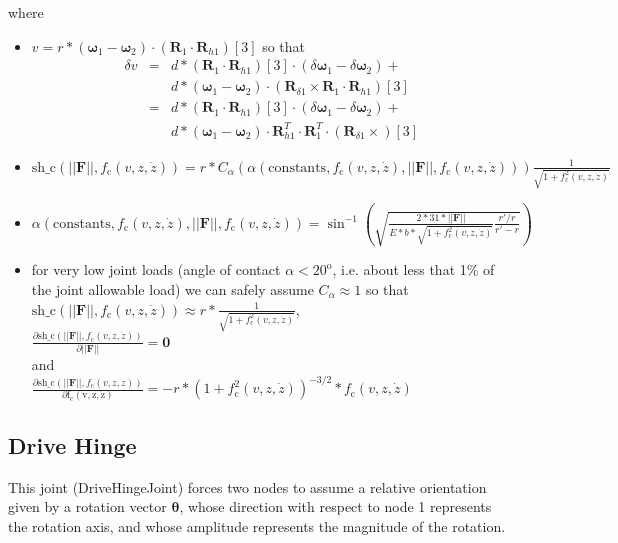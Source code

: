 \documentclass[10pt,dvips,fleqn,subeqn]{report}
\newcommand{\T}[1]{\boldsymbol{#1}}
\begin{document}
where
\begin{itemize}
\item
$v=r * (\T \omega_{1}-\T \omega_{2})\cdot(\T R_1\cdot \T R_{h1})[3]$
so that
\begin{eqnarray*}
\delta v &=& d * (\T R_1\cdot \T R_{h1})[3] \cdot (\delta \T \omega_{1}- \delta \T \omega_{2}) +\\
	&& d * (\T \omega_{1}-\T \omega_{2})\cdot (\T R_{\delta 1} \times \T R_1 \cdot \T R_{h1})[3]\\
	&=& d * (\T R_1\cdot \T R_{h1})[3] \cdot (\delta \T \omega_{1}- \delta \T \omega_{2}) +\\
	&& d * (\T \omega_{1}-\T \omega_{2})\cdot \T R_{h1}^T \cdot \T R_1^T \cdot (\T R_{\delta 1} \times )[3]
\end{eqnarray*}
\item
$
\mathrm{sh\_c}(||\T F||, f_{\mathrm{c}}(v,z,\dot{z}))=
r * 
C_\alpha(
	\alpha(\mathrm{constants},
		f_{\mathrm{c}}(v,z,\dot{z}),
		||\T F||,
		f_{\mathrm{c}}(v,z,\dot{z})
	)
) 
\frac{\displaystyle 1}{\displaystyle \sqrt{1+f_{\mathrm{c}}^2(v,z,\dot{z})}}
$
\item
$
\alpha(\mathrm{constants},
	f_{\mathrm{c}}(v,z,\dot{z}),
	||\T F||,
	f_{\mathrm{c}}(v,z,\dot{z})
) =
\sin^{-1}\left(
	\sqrt{
		\frac{\displaystyle 2*31*||\T F||}
			{\displaystyle E*b*\sqrt{1+f_{\mathrm{c}}^2(v,z,\dot{z})}}
		\frac{\displaystyle r'/r}
			{\displaystyle r'-r}
	}
\right)
$
\item for very low joint loads (angle of contact $\alpha< 20^{\mathrm{o}}$,
i.e. about less that 1\% of the joint allowable load)
we can safely assume $C_\alpha\approx 1$
so that\\ 
$
\mathrm{sh\_c}(||\T F||, f_{\mathrm{c}}(v,z,\dot{z}))\approx
r * 
\frac{\displaystyle 1}{\displaystyle \sqrt{1+f_{\mathrm{c}}^2(v,z,\dot{z})}}
$,\\

$
\frac{\displaystyle\partial \mathrm{sh\_c}(||\T F||, f_{\mathrm{c}}(v,z,\dot{z}))}
	{\displaystyle \partial ||\T F||} = \T 0
$\\
and\\
$
\frac{\displaystyle\partial \mathrm{sh\_c}(||\T F||, f_{\mathrm{c}}(v,z,\dot{z}))}
	{\displaystyle\partial \mathrm{f_{\mathrm{c}}(v,z,\dot{z})}} =
	-r * (1+f_{\mathrm{c}}^2(v,z,\dot{z}))^{-3/2}*f_{\mathrm{c}}(v,z,\dot{z})
$
\end{itemize}




\subsection{Drive Hinge}
This joint (DriveHingeJoint) forces two nodes to assume a relative orientation
given by a rotation vector $\T{\theta}$, whose direction with respect
to node 1 represents the rotation axis, and whose amplitude represents 
the magnitude of the rotation.
\end{document}
